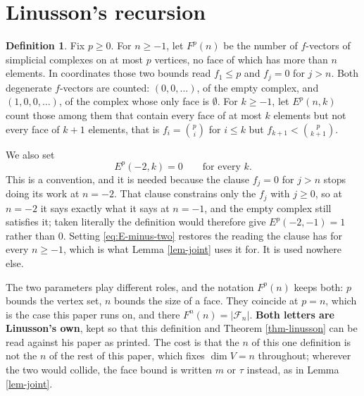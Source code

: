 \documentclass[11pt, a4paper, abstract=yes]{scrartcl}
\theoremstyle{definition}
\newtheorem{definition}{Definition}
\theoremstyle{remark}
\theoremstyle{plain}
\begin{document}
\section{Linusson's recursion}
\label{sec-linusson}
\begin{definition}
\textcite[\S3]{Linusson1999} Fix \(p\ge0\). For \(n\ge-1\), let \(F^p(n)\) be the number of
\(f\)-vectors of simplicial complexes on at most \(p\) vertices, no face of which has more than
\(n\) elements. In coordinates those two bounds read \(f_1\le p\) and \(f_j=0\) for \(j>n\). Both
degenerate \(f\)-vectors are counted: \((0,0,\dots)\), of the empty complex, and
\((1,0,0,\dots)\), of the complex whose only face is \(\emptyset\). For \(k\ge-1\), let
\(E^p(n,k)\) count those among them that contain every face of at most \(k\)
elements but not every face of \(k+1\) elements, that is \(f_i=\binom pi\) for \(i\le k\) but
\(f_{k+1}<\binom p{k+1}\).

We also set
\begin{equation}\label{eq:E-minus-two}
  E^p(-2,k)=0\qquad\text{for every }k .
\end{equation}
This is a convention, and it is needed because the clause \(f_j=0\) for \(j>n\) stops doing its
work at \(n=-2\). That clause constrains only the \(f_j\) with \(j\ge0\), so at \(n=-2\) it says
exactly what it says at \(n=-1\), and the empty complex still satisfies it; taken literally the
definition would therefore give \(E^p(-2,-1)=1\) rather than \(0\). Setting
\eqref{eq:E-minus-two} restores the reading the clause has for every \(n\ge-1\), which is what
Lemma \ref{lem-joint} uses it for. It is used nowhere else.
\label{def-linusson}
\end{definition}

The two parameters play different roles, and the notation \(F^p(n)\) keeps both: \(p\) bounds the
vertex set, \(n\) bounds the size of a face. They coincide at \(p=n\), which is the case this paper
runs on, and there \(F^n(n)=\lvert\mathcal F_n\rvert\). \textbf{Both letters are Linusson's own}, kept so
that this definition and Theorem \ref{thm-linusson} can be read against his paper as printed. The
cost is that the \(n\) of this one definition is not the \(n\) of the rest of this paper, which
fixes \(\dim V=n\) throughout; wherever the two would collide, the face bound is written \(m\) or
\(\tau\) instead, as in Lemma \ref{lem-joint}.
\end{document}
